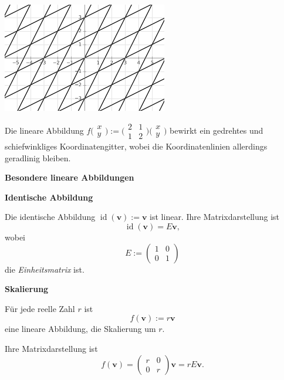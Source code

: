 \documentclass[9pt]{beamer}
\newcommand{\bv}[1]{\mathbf{#1}}
\newcommand{\id}{\operatorname{id}}
\newcommand{\strong}[1]{\textsf{\textbf{#1}}}
\newcommand{\icol}[1]{
  \big(\!\begin{smallmatrix}#1\end{smallmatrix}\!\big)%
}
\newcommand{\parspace}{\vspace{0.8em}}
\begin{document}
\begin{frame}[t]
\vspace{2em}
\begin{center}
\includegraphics[width=72mm]{img/linear.png}

\parspace
Die lineare Abbildung $f\icol{x\\ y}
:= \icol{2 & 1\\ 1 & 2}\icol{x\\ y}$ bewirkt ein gedrehtes und
schiefwinkliges Koordinatengitter, wobei die Koordinatenlinien
allerdings geradlinig bleiben.
\end{center}
\end{frame}

\begin{frame}
\begin{center}
\strong{Besondere lineare Abbildungen}
\end{center}
\end{frame}

\begin{frame}
\strong{Identische Abbildung}

\parspace
Die identische Abbildung $\id(\bv v):=\bv v$ ist linear. Ihre
Matrixdarstellung ist
\[\id(\bv v) = E\bv v,\]
wobei
\[E := \begin{pmatrix}1 & 0\\ 0 & 1\end{pmatrix}\]
die \emph{Einheitsmatrix} ist.
\end{frame}

\begin{frame}
\strong{Skalierung}

\parspace
Für jede reelle Zahl $r$ ist
\[f(\bv v) := r\bv v\]
eine lineare Abbildung, die Skalierung um $r$.
\parspace

Ihre Matrixdarstellung ist
\[f(\bv v) = \begin{pmatrix}r & 0\\ 0 & r\end{pmatrix}\bv v
= rE\bv v.\]
\end{frame}
\end{document}
